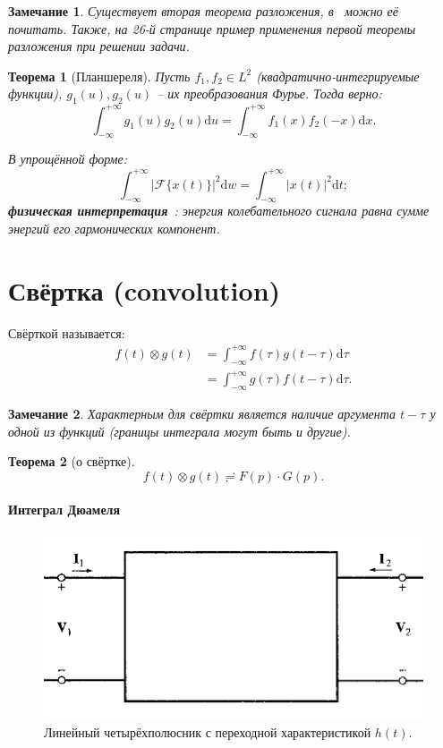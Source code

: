 \documentclass[12pt]{report}
\newcommand{\F}{\mathcal F}
\newcommand{\rd}{\mathrm d}
\newtheorem{thm}{Теорема}
\newtheorem{rmk}{Замечание}
\begin{document}
\begin{rmk}
	Существует вторая теорема разложения, в~\cite[стр.~27]{Dubkov:Lecture} можно её почитать. 
	Также, на 26-й странице пример применения первой теоремы разложения при решении задачи.
\end{rmk}

\begin{thm}[Планшереля]
	Пусть $f_1,f_2 \in L^2$ (квадратично-интегрируемые функции), $g_1(u), g_2(u)$ -- их преобразования Фурье. Тогда верно:
	\[
	\int_{-\infty}^{+\infty} g_1(u)g_2(u)\rd u = \int_{-\infty}^{+\infty} f_1(x)f_2(-x)\rd x.
	\]
	
	В упрощённой форме:
	\[
	\int_{-\infty}^{+\infty} |\F\{x(t)\}|^2\rd w = \int_{-\infty}^{+\infty}|x(t)|^2\rd t;
	\]
	\textbf{физическая интерпретация}~\cite[после~ф-лы~8]{Plancherel}: \emph{энергия колебательного сигнала равна сумме энергий его гармонических компонент.}
\end{thm}

\section{Свёртка (convolution)}
Свёрткой называется:
\begin{align*}
f(t)\otimes g(t) &= \int_{-\infty}^{+\infty} f(\tau)g(t-\tau)\rd\tau \\
&= \int_{-\infty}^{+\infty} g(\tau)f(t-\tau)\rd\tau.
\end{align*}

\begin{rmk}
	Характерным для свёртки является наличие аргумента $t-\tau$ у одной из функций (границы интеграла могут быть и другие).
\end{rmk}

\begin{thm}[о свёртке\label{thm:convolution}]
	\[
	f(t)\otimes g(t)\risingdotseq F(p)\cdot G(p).
	\]
\end{thm}

\paragraph{Интеграл Дюамеля}
\begin{figure}[h]\centering
	\includegraphics[width=\linewidth]{quadripole}
	\caption{Линейный четырёхполюсник с переходной характеристикой $h(t)$.\label{fig:quadripole}}
\end{figure}
\end{document}
